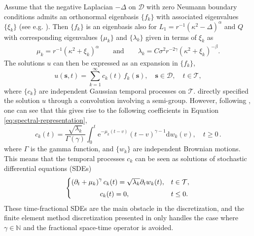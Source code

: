\documentclass[12pt]{article} %
\begin{document}
Assume that the negative Laplacian $-\Delta$ on $\mathcal D$ %
with zero Neumann boundary conditions admits an orthonormal eigenbasis $\{f_k\}$ with associated eigenvalues $\{\xi_k\}$ (see e.g. \cite{davies1995}). Then $\{f_k\}$ is an eigenbasis also for $L_1 = r^{-1}(\kappa^2-\Delta)^\alpha$ and $Q$ with corresponding eigenvalues $\{\mu_k\}$ and $\{\lambda_k\}$ given in terms of $\xi_k$ as
\begin{align}\label{m-l}
 \mu_k = r^{-1} (\kappa^2 + \xi_k)^{\alpha}\qquad\text{and}\qquad \lambda_k = C \sigma^2 r^{- 2\gamma} (\kappa^2 + \xi_k)^{-\beta}.   
\end{align}
The solutions $u$ can then be expressed as an expansion in $\{f_k\}$,
\begin{equation} \label{eq:spectral-representation}
u(\boldsymbol{s},t) = \sum_{k = 1}^\infty c_k(t)\, f_k(\boldsymbol{s}), \quad \boldsymbol{s}\in\mathcal{D}, \quad t\in\mathcal{T},
\end{equation}
 where $\{c_k\}$ are independent Gaussian temporal processes on $\mathcal{T}$. 
%
\citet{kirchner2022} directly specified the solution $u$ through a convolution involving a semi-group. However, following \citet{Furset2023}, one can see that this gives rise to the following coefficients %
in Equation \eqref{eq:spectral-representation}, 
\begin{equation}
    c_k(t) = \frac{\sqrt{\lambda_k}}{\Gamma(\gamma)} \int_0^t \mathrm{e}^{-\mu_k (t-v)} (t-v)^{\gamma - 1}\text{d} w_k(v), \quad t \geq 0 \, .\label{eq:cov:time}
\end{equation}
where $\Gamma$ is the gamma function, and $\{w_k\}$ are independent Brownian motions. This means that the temporal processes $c_k$ can be seen as solutions of stochastic differential equations (SDEs)
\begin{align}
\begin{cases}
    \left(\partial_t + \mu_{k}\right)^\gamma c_{k}(t) = \sqrt{\lambda_{k}} \partial_t w_{k}(t), & t\in \mathcal{T}, \\[0.1cm]
    \hspace{1.46cm} c_k(t) = 0, & t \leq 0.
    \end{cases}
    \label{eq:SPDE:SDE}
\end{align}
These time-fractional SDEs are the main obstacle in the discretization, and the finite element method discretization presented in \citet{LindgrenBakka} only handles the case where $\gamma\in\mathbb{N}$ and the fractional space-time operator is avoided.
\end{document}
